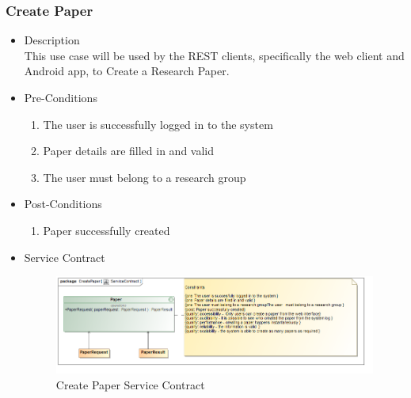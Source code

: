 \documentclass[a4paper,10pt]{article}
\begin{document}
\subsubsection{Create Paper}
	\begin{itemize}
		\item Description\\
			This use case will be used by the REST clients, specifically the web client and Android app, to Create a Research Paper.
		\item Pre-Conditions
			\begin{enumerate}
				\item The user is successfully logged in to the system
				\item Paper details are filled in and valid
				\item The user must belong to a research group
			\end{enumerate}
		\item Post-Conditions
			\begin{enumerate}
				\item Paper successfully created

						
			\end{enumerate}
		\item Service Contract
			\begin{figure}[H]
				\includegraphics[scale=0.5]{CreatePaperServiceContract}
				\caption{Create Paper Service Contract}
			\end{figure}



	\end{itemize}
\end{document}
